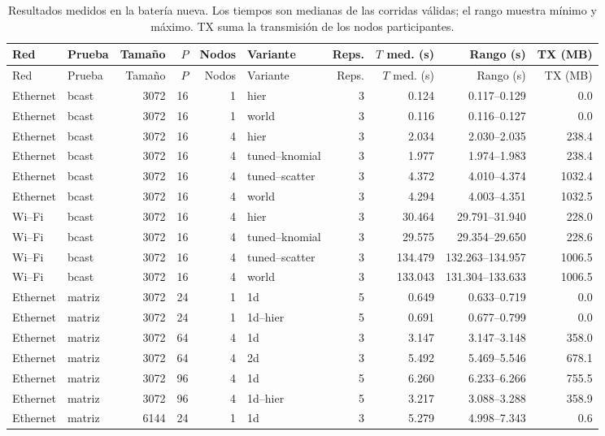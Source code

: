 \begin{longtable}{llrrrlrrrr}
\caption{Resultados medidos en la batería nueva. Los tiempos son medianas de las corridas válidas; el rango muestra mínimo y máximo. TX suma la transmisión de los nodos participantes.}\\
\toprule Red & Prueba & Tamaño & $P$ & Nodos & Variante & Reps. & $T$ med. (s) & Rango (s) & TX (MB) \\
\midrule\endfirsthead
\toprule Red & Prueba & Tamaño & $P$ & Nodos & Variante & Reps. & $T$ med. (s) & Rango (s) & TX (MB) \\
\midrule\endhead
Ethernet & bcast & 3072 & 16 & 1 & hier & 3 & 0.124 & 0.117--0.129 & 0.0 \\
Ethernet & bcast & 3072 & 16 & 1 & world & 3 & 0.116 & 0.116--0.127 & 0.0 \\
Ethernet & bcast & 3072 & 16 & 4 & hier & 3 & 2.034 & 2.030--2.035 & 238.4 \\
Ethernet & bcast & 3072 & 16 & 4 & tuned--knomial & 3 & 1.977 & 1.974--1.983 & 238.4 \\
Ethernet & bcast & 3072 & 16 & 4 & tuned--scatter & 3 & 4.372 & 4.010--4.374 & 1032.4 \\
Ethernet & bcast & 3072 & 16 & 4 & world & 3 & 4.294 & 4.003--4.351 & 1032.5 \\
Wi--Fi & bcast & 3072 & 16 & 4 & hier & 3 & 30.464 & 29.791--31.940 & 228.0 \\
Wi--Fi & bcast & 3072 & 16 & 4 & tuned--knomial & 3 & 29.575 & 29.354--29.650 & 228.6 \\
Wi--Fi & bcast & 3072 & 16 & 4 & tuned--scatter & 3 & 134.479 & 132.263--134.957 & 1006.5 \\
Wi--Fi & bcast & 3072 & 16 & 4 & world & 3 & 133.043 & 131.304--133.633 & 1006.5 \\
Ethernet & matriz & 3072 & 24 & 1 & 1d & 5 & 0.649 & 0.633--0.719 & 0.0 \\
Ethernet & matriz & 3072 & 24 & 1 & 1d--hier & 5 & 0.691 & 0.677--0.799 & 0.0 \\
Ethernet & matriz & 3072 & 64 & 4 & 1d & 3 & 3.147 & 3.147--3.148 & 358.0 \\
Ethernet & matriz & 3072 & 64 & 4 & 2d & 3 & 5.492 & 5.469--5.546 & 678.1 \\
Ethernet & matriz & 3072 & 96 & 4 & 1d & 5 & 6.260 & 6.233--6.266 & 755.5 \\
Ethernet & matriz & 3072 & 96 & 4 & 1d--hier & 5 & 3.217 & 3.088--3.288 & 358.9 \\
Ethernet & matriz & 6144 & 24 & 1 & 1d & 3 & 5.279 & 4.998--7.343 & 0.6 \\

\end{longtable}
